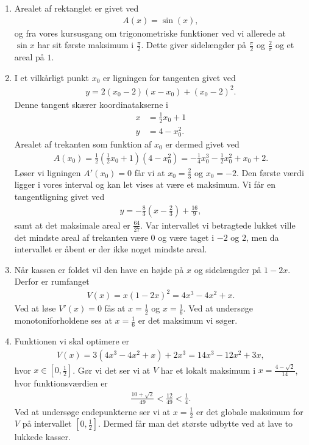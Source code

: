 \begin{enumerate}
	\item Arealet af rektanglet er givet ved
	\begin{align*}
	A(x)=\sin(x),
	\end{align*}
	og fra vores kursusgang om trigonometriske funktioner ved vi allerede at $\sin x$ har sit første maksimum i $\frac{\pi}{2}$. Dette giver sidelængder på $\frac{\pi}{2}$ og $\frac{2}{\pi}$ og et areal på $1$.
	
	\item I et vilkårligt punkt $x_0$ er ligningen for tangenten givet ved 
	\begin{align*}
	y=2(x_0-2)(x-x_0)+(x_0-2)^2.
	\end{align*}
	Denne tangent skærer koordinatakserne i
	\begin{align*}
	x&=\frac{1}{2}x_0+1\\
	y&=4-x_0^2.
	\end{align*}
	Arealet af trekanten som funktion af $x_0$ er dermed givet ved
	\begin{align*}
	A(x_0)=\frac{1}{2}(\frac{1}{2}x_0+1)(4-x_0^2)=-\frac{1}{4}x_0^3-\frac{1}{2}x_0^2+x_0+2.
	\end{align*}
	Løser vi ligningen $A'(x_0)=0$ får vi at $x_0=\frac{2}{3}$ og $x_0=-2$. Den første værdi ligger i vores interval og kan let vises at være et maksimum. Vi får en tangentligning givet ved
	\begin{align*}
	y=-\frac{8}{3}(x-\frac{2}{3})+\frac{16}{9},
	\end{align*}
	samt at det maksimale areal er $\frac{64}{27}$. Var intervallet vi betragtede lukket ville det mindste areal af trekanten være $0$ og være taget i $-2$ og $2$, men da intervallet er åbent er der ikke noget mindste areal. 
	
	
	\item\label{it:opt1ans} Når kassen er foldet vil den have en højde på $x$ og sidelængder på $1-2x$. Derfor er rumfanget
	\begin{align*}
	V(x)=x(1-2x)^2=4x^3-4x^2+x.
	\end{align*}
	Ved at løse $V'(x)=0$ fås at $x=\frac{1}{2}$ og $x=\frac{1}{6}$. Ved at undersøge monotoniforholdene ses at $x=\frac{1}{6}$ er det maksimum vi søger.
	
	
	\item Funktionen vi skal optimere er
	\begin{align*}
	V(x)=3(4x^3-4x^2+x)+2x^3=14x^3-12x^2+3x,
	\end{align*}
	hvor $x\in [0,\frac{1}{2}]$. Gør vi det ser vi at $V$ har et lokalt maksimum i $x=\frac{4-\sqrt{2}}{14}$, hvor funktionsværdien er
	\begin{align*}
	\frac{10+\sqrt{2}}{49}<\frac{12}{49}<\frac{1}{4}.
	\end{align*}
	Ved at undersøge endepunkterne ser vi at $x=\frac{1}{2}$ er det globale maksimum for $V$ på intervallet $ [0,\frac{1}{2}] $. Dermed får man det største udbytte ved at lave to lukkede kasser.


\end{enumerate}
